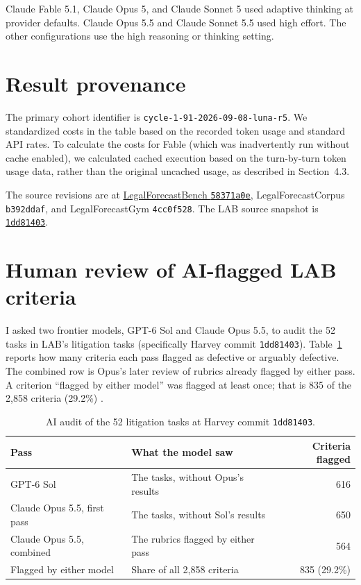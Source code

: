 \documentclass[11pt]{article}
\newcommand{\labTasks}{52}
\newcommand{\labCriteria}{2{,}858}
\newcommand{\labSolFlagged}{616}
\newcommand{\labOpusBlind}{650}
\newcommand{\labOpusFinal}{564}
\newcommand{\labFlagged}{835}
\newcommand{\labFlaggedPct}{29.2}
\begin{document}
Claude Fable 5.1, Claude Opus 5, and Claude Sonnet 5 used adaptive thinking at provider defaults. Claude Opus 5.5 and Claude Sonnet 5.5 used high effort. The other configurations use the high reasoning or thinking setting.

\section{Result provenance}
The primary cohort identifier is \texttt{cycle-1-91-2026-09-08-luna-r5}. We standardized costs in the table based on the recorded token usage and standard API rates. To calculate the costs for Fable (which was inadvertently run without cache enabled), we calculated cached execution based on the turn-by-turn token usage data, rather than the original uncached usage, as described in Section~4.3.

The source revisions are at \href{https://github.com/johnhughes3/LegalForecastBench/tree/58371a0e13494e591710e2eae3da8e428eebc359}{LegalForecastBench \texttt{58371a0e}}, LegalForecastCorpus \texttt{b392ddaf}, and LegalForecastGym \texttt{4cc0f528}. The LAB source snapshot is \href{https://github.com/harveyai/harvey-labs/tree/1dd81403b2fbb60596f7aea3fcecafad7bf73143}{\texttt{1dd81403}}.


\section{Human review of AI-flagged LAB criteria}
\label{app:labreview}
I asked two frontier models, GPT-6 Sol and Claude Opus 5.5, to audit the \labTasks{} tasks in LAB's litigation tasks (specifically Harvey commit \texttt{1dd81403}). Table~\ref{tab:labaudit} reports how many criteria each pass flagged as defective or arguably defective. The combined row is Opus's later review of rubrics already flagged by either pass. A criterion ``flagged by either model'' was flagged at least once; that is \labFlagged{} of the \labCriteria{} criteria (\labFlaggedPct\%) \citep{labaudit}.

\begin{table}[ht]\centering\small
\begin{tabular}{llr}\toprule
Pass & What the model saw & Criteria flagged\\\midrule
GPT-6 Sol & The tasks, without Opus's results & \labSolFlagged{}\\
Claude Opus 5.5, first pass & The tasks, without Sol's results & \labOpusBlind{}\\
Claude Opus 5.5, combined & The rubrics flagged by either pass & \labOpusFinal{}\\\midrule
Flagged by either model & Share of all \labCriteria{} criteria & \labFlagged{} (\labFlaggedPct\%)\\
\bottomrule\end{tabular}
\caption{AI audit of the \labTasks{} litigation tasks at Harvey commit \texttt{1dd81403}.}
\label{tab:labaudit}\end{table}
\end{document}
